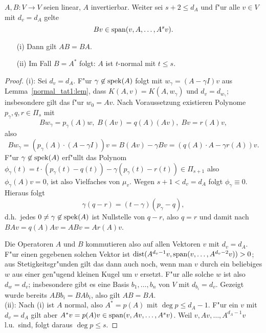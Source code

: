 \begin{lem} \label{FMproof1:lem}
$A,B: V \to V$ seien linear, $A$ invertierbar. Weiter sei $s+2 \leq d_A$ und 
f"ur alle $v \in V$ mit $d_v = d_A$  gelte
\[
Bv \in \operatorname{span}(v,A,\ldots,A^s v).
\]
\begin{itemize}
\item[(i)] Dann gilt $AB = BA$.
\item[(ii)] Im Fall $B = A^*$ folgt: $A$ ist $t$-normal mit $t \leq s$.
\end{itemize} 
\end{lem}
\begin{proof}
(i): Sei $d_v = d_A$. F"ur $\gamma \not \in \operatorname{spek}(A)$ folgt mit $w_\gamma = (A-\gamma I)v$
aus Lemma~\ref{normal_tat1:lem}, dass $K(A,v) = K(A,w_\gamma)$ und $d_v = d_{w_\gamma}$; insbesondere gilt das f"ur $w_0 = Av$. Nach Voraussetzung existieren Polynome $p_\gamma,
q,r \in \Pi_s$ mit
\begin{equation} \label{BAs:eq}
   Bw_\gamma = p_\gamma(A)w, \; B(Av) = q(A)(Av), \; Bv = r(A)v,
\end{equation}
also
\[
Bw_\gamma = (p_\gamma(A)\cdot(A -\gamma I))v = B(Av)-\gamma Bv = (q(A)\cdot A - \gamma r(A))v. 
\]
F"ur $\gamma \not \in \operatorname{spek}(A)$ erf"ullt das Polynom $\phi_\gamma(t) = t\cdot(p_\gamma(t)-q(t))-\gamma(p_\gamma(t)-r(t)) \in \Pi_{s+1}$ 
also $\phi_\gamma(A)v = 0$, ist also Vielfaches von $\mu_v$. Wegen $ s+1 < d_v = d_A$
folgt $\phi_\gamma \equiv 0$. Hieraus folgt 
\[
   \gamma(q-r) = (t-\gamma)(p_\gamma - q),
\]
d.h.\ jedes $0 \neq \gamma \not \in \operatorname{spek}(A)$ ist Nullstelle von $q-r$,
also $q=r$ und damit nach  $BAv = q(A)Av = ABv = Ar(A)v$. 

Die Operatoren
$A$ und $B$  kommutieren also auf allen Vektoren $v$ mit $d_v = d_A$. F"ur einen gegebenen solchen Vektor
ist $\mbox{dist}(A^{d_v-1}v,\operatorname{span}(v,\ldots,A^{d_v-2}v)) >0$; aus Stetigkeitsgr"unden 
gilt das dann auch noch, wenn man $v$ durch ein beliebiges $w$ aus einer gen"ugend kleinen 
Kugel um $v$ ersetzt. F"ur alle solche $w$ ist also $d_w = d_v$; insbesondere gibt
es eine Basis $b_1,\ldots,b_n$ von $V$ mit $d_{b_i} = d_v$. Gezeigt wurde bereits
$ABb_i = BAb_i$, also gilt $AB = BA$. \smallskip \\
(ii): Nach (i) ist $A$ normal, also $A^* = p(A)$ mit $\deg p \leq d_A-1$. F"ur ein $v$ mit 
$d_v = d_A$ gilt aber $A^*v = p(A)v \in \operatorname{span}(v,Av,\ldots,A^sv)$. Weil $v,Av,\ldots,A^{d_A-1}v$
l.u.\ sind, folgt daraus $\deg p \leq s$.
\end{proof}
\medskip


